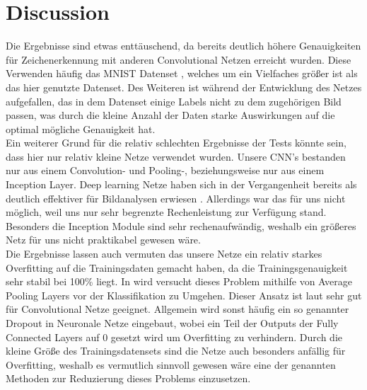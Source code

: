 \documentclass[runningheads,a4paper]{llncs}[2015/06/24]
\begin{document}
\section{Discussion}\label{sec:Discussion}
Die Ergebnisse sind etwas enttäuschend, da bereits deutlich höhere Genauigkeiten für Zeichenerkennung mit anderen Convolutional Netzen erreicht wurden. Diese Verwenden häufig das MNIST Datenset \cite{mnist}, welches um ein Vielfaches größer ist als das hier genutzte Datenset. Des Weiteren ist während der Entwicklung des Netzes aufgefallen, das in dem Datenset einige Labels nicht zu dem zugehörigen Bild passen, was durch die kleine Anzahl der Daten starke Auswirkungen auf die optimal mögliche Genauigkeit hat.\\
Ein weiterer Grund für die relativ schlechten Ergebnisse der Tests könnte sein, dass hier nur relativ kleine Netze verwendet wurden. Unsere CNN's bestanden nur aus einem Convolution- und Pooling-, beziehungsweise nur aus einem Inception Layer. Deep learning Netze haben sich in der Vergangenheit bereits als deutlich effektiver für Bildanalysen erwiesen \cite{deep_conv}. Allerdings war das für uns nicht möglich, weil uns nur sehr begrenzte Rechenleistung zur Verfügung stand. Besonders die Inception Module sind sehr rechenaufwändig, weshalb ein größeres Netz für uns nicht praktikabel gewesen wäre.\\
Die Ergebnisse lassen auch vermuten das unsere Netze ein relativ starkes Overfitting auf die Trainingsdaten gemacht haben, da die Trainingsgenauigkeit sehr stabil bei 100\% liegt. In \cite{inception_paper} wird versucht dieses Problem mithilfe von Average Pooling Layers vor der Klassifikation zu Umgehen. Dieser Ansatz ist laut \cite{average_pooling_paper} sehr gut für Convolutional Netze geeignet. Allgemein wird sonst häufig ein so genannter Dropout in Neuronale Netze eingebaut, wobei ein Teil der Outputs der Fully Connected Layers auf 0 gesetzt wird um Overfitting zu verhindern. Durch die kleine Größe des Trainingsdatensets sind die Netze auch besonders anfällig für Overfitting, weshalb es vermutlich sinnvoll gewesen wäre eine der genannten Methoden zur Reduzierung dieses Problems einzusetzen.\\
\end{document}
